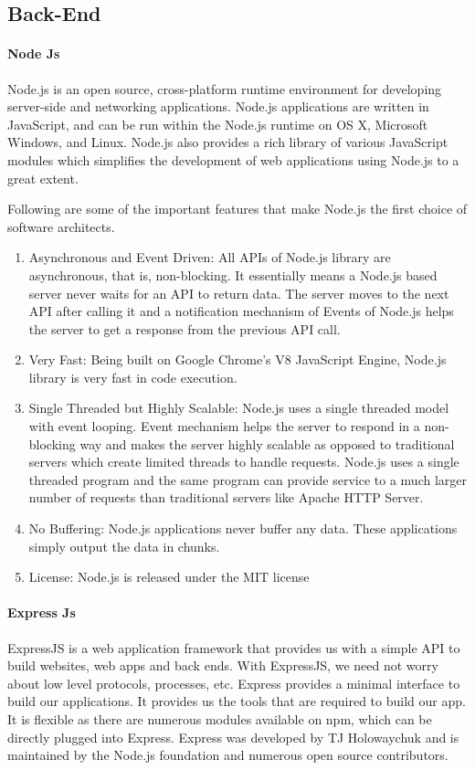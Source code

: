 \subsection{Back-End}
\paragraph{Node Js}
Node.js is an open source, cross-platform runtime environment for developing server-side and networking applications. Node.js applications are written in JavaScript, and can be run within the Node.js runtime on OS X, Microsoft Windows, and Linux.
Node.js also provides a rich library of various JavaScript modules which simplifies the development of web applications using Node.js to a great extent.

Following are some of the important features that make Node.js the first choice of software architects.
\begin{enumerate}
      \item
            Asynchronous and Event Driven: All APIs of Node.js library are asynchronous, that is, non-blocking. It essentially means a Node.js based server never waits for an API to return data. The server moves to the next API after calling it and a notification mechanism of Events of Node.js helps the server to get a response from the previous API call.
      \item
            Very Fast: Being built on Google Chrome's V8 JavaScript Engine, Node.js library is very fast in code execution.
      \item
            Single Threaded but Highly Scalable: Node.js uses a single threaded model with event looping. Event mechanism helps the server to respond in a non-blocking way and makes the server highly scalable as opposed to traditional servers which create limited threads to handle requests. Node.js uses a single threaded program and the same program can provide service to a much larger number of requests than traditional servers like Apache HTTP Server.
      \item
            No Buffering: Node.js applications never buffer any data. These applications simply output the data in chunks.
      \item
            License: Node.js is released under the MIT license
\end{enumerate}





\paragraph{Express Js}
ExpressJS is a web application framework that provides us with a simple API to build websites, web apps and back ends. With ExpressJS, we need not worry about low level protocols, processes, etc.
Express provides a minimal interface to build our applications. It provides us the tools that are required to build our app. It is flexible as there are numerous modules available on npm, which can be directly plugged into Express.
Express was developed by TJ Holowaychuk and is maintained by the Node.js foundation and numerous open source contributors.



